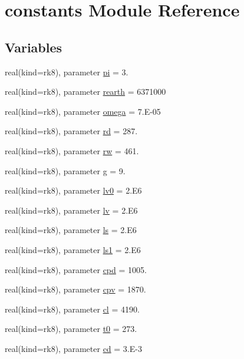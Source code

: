 \hypertarget{namespaceconstants}{}\section{constants Module Reference}
\label{namespaceconstants}
\subsection*{Variables}
\begin{DoxyCompactItemize}
\item 
real(kind=rk8), parameter \hyperlink{namespaceconstants_a064bd715409f723a4e6d45b6300c5ca0}{pi} = 3.
\item 
real(kind=rk8), parameter \hyperlink{namespaceconstants_afaa5eaa2c9ee648a808fb8e1c94e76f8}{rearth} = 6371000
\item 
real(kind=rk8), parameter \hyperlink{namespaceconstants_a67051296d7b4bcd0d4cee08bba6e46fa}{omega} = 7.\+E-\/05
\item 
real(kind=rk8), parameter \hyperlink{namespaceconstants_ad91564da82b97ea0d29ce0565565db85}{rd} = 287.
\item 
real(kind=rk8), parameter \hyperlink{namespaceconstants_a7ef8fc37397fbfbefd3c22883378dcc5}{rw} = 461.
\item 
real(kind=rk8), parameter \hyperlink{namespaceconstants_a046aef138fbc8d05251d4fdc6eb3ee89}{g} = 9.
\item 
real(kind=rk8), parameter \hyperlink{namespaceconstants_afb3befdfd57058ee9d073b832134a601}{lv0} = 2.\+E6
\item 
real(kind=rk8), parameter \hyperlink{namespaceconstants_ab8db38b502faac0658c66b0d0b56c266}{lv} = 2.\+E6
\item 
real(kind=rk8), parameter \hyperlink{namespaceconstants_a0fdb1c80757efccb4c694c79206a3d83}{ls} = 2.\+E6
\item 
real(kind=rk8), parameter \hyperlink{namespaceconstants_abf3a57ecb3de0f79c3155c170db798f6}{ls1} = 2.\+E6
\item 
real(kind=rk8), parameter \hyperlink{namespaceconstants_a32354adf3493f59d0fc17b0302b2c368}{cpd} = 1005.
\item 
real(kind=rk8), parameter \hyperlink{namespaceconstants_afc5ea9cd5f9cf3a42e750ba5ab73c967}{cpv} = 1870.
\item 
real(kind=rk8), parameter \hyperlink{namespaceconstants_a4f2911e99beba65b9371b9a80d7c08d0}{cl} = 4190.
\item 
real(kind=rk8), parameter \hyperlink{namespaceconstants_a753fbbdd5d5b4af00d6819cb78ba99a1}{t0} = 273.
\item 
real(kind=rk8), parameter \hyperlink{namespaceconstants_a84ecaaf3771cbbfe65f7b15ef26bee36}{cd} = 3.\+E-\/3
\end{DoxyCompactItemize}


